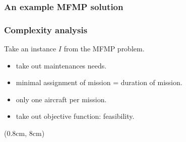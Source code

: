 \begin{frame}
\frametitle{\textbf{An example MFMP solution}}
  
\end{frame}

\begin{frame}
\frametitle{\textbf{Complexity analysis}}
  
  Take an instance $I$ from the MFMP problem.
  \pause
  \begin{itemize}[<+->]
    \item take out maintenances needs.
    \item minimal assignment of mission = duration of mission.
    \item only one aircraft per mission.
    \item take out objective function: feasibility.
  \end{itemize}

  \begin{textblock*}{1.1\textwidth}(0.8cm, 8cm)
    \begin{flushleft}
    \end{flushleft}
  \end{textblock*}

\end{frame}

